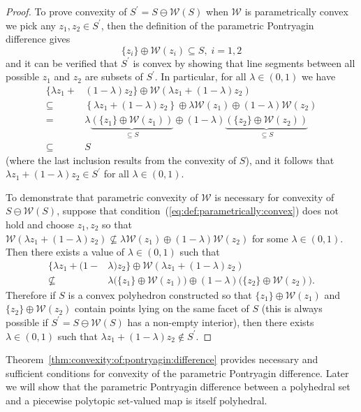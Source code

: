 \documentclass[a4paper, 12pt, twoside]{article}
\theoremstyle{definition}
\numberwithin{equation}{section}
\begin{document}
\begin{proof}
To prove convexity of $S^\prime =  S\ominus \mathcal W( S)$ when $\mathcal W$ is parametrically convex we pick any $z_1,z_2\in S^\prime$, then
the definition of the parametric Pontryagin difference gives
\begin{equation}
  \{z_i\} \oplus \mathcal W(z_i) \subseteq S,\; i=1,2 
\end{equation}
%
and it can be verified that $S^\prime$ is convex by showing that line segments between all possible $z_1$ and $z_2$ are subsets of $S^\prime$. In particular, for all $\lambda \in (0,1)$ we have
\begin{align*}
  \{ \lambda z_1 + &(1-\lambda)z_2
  \}\oplus \mathcal W\left( \lambda z_1 + (1-\lambda)z_2\right)\\
  \subseteq&\left\{ \lambda z_1 + (1-\lambda)z_2
  \right\}\oplus \lambda \mathcal W(z_1) \oplus (1-\lambda)
  \mathcal W(z_2)\\
 = &\lambda\underbrace{(\{z_1\}\oplus \mathcal W(z_1))}_{\subseteq S}\oplus
  (1-\lambda)\underbrace{(\{z_2\}\oplus \mathcal W(z_2))}_{\subseteq S}\\
  \subseteq& S
\end{align*}
%
(where the last inclusion results from the convexity of $S$), and it follows that
$\lambda z_1 + (1-\lambda) z_2 \in S^\prime$ for all $\lambda \in (0,1)$. 
%

To demonstrate that parametric convexity of $\mathcal W$ is necessary for convexity of $S\ominus \mathcal W(S)$, suppose that condition~(\ref{eq:def:parametrically:convex}) does not hold and choose $z_1,z_2$ so that $\mathcal W(\lambda z_1 + (1-\lambda) z_2) \not\subseteq \lambda \mathcal W(z_1) \oplus (1-\lambda) \mathcal W (z_2)$ for some $\lambda \in (0,1)$. Then there exists a value of $\lambda\in(0,1)$ such that
\begin{align*}
  \{ \lambda z_1 + (1-&\lambda)z_2
  \}\oplus \mathcal W\left( \lambda z_1 + (1-\lambda)z_2\right)\\
 \not\subseteq &\lambda\bigl(\{z_1\}\oplus \mathcal W(z_1)\bigr)\oplus
  (1-\lambda)\bigl(\{z_2\}\oplus \mathcal W(z_2)\bigr) .
\end{align*}
Therefore if $S$ is a convex polyhedron constructed so that $\{z_1\}\oplus\mathcal W(z_1)$ and $\{z_2\}\oplus\mathcal W(z_2)$ contain points lying on the same facet of $S$ (this is always possible if $S^\prime=S\ominus \mathcal W(S)$ has a non-empty interior), then there exists $\lambda \in (0,1)$ such that $\lambda z_1 + (1-\lambda) z_2 \notin S^\prime$.
%
\end{proof}
%
Theorem~\ref{thm:convexity:of:pontryagin:difference} provides necessary and sufficient conditions for convexity of the parametric Pontryagin difference. 
%
Later we will show that the parametric Pontryagin difference between a polyhedral set and a piecewise polytopic set-valued map is itself polyhedral.
%
%
%
%
\end{document}
